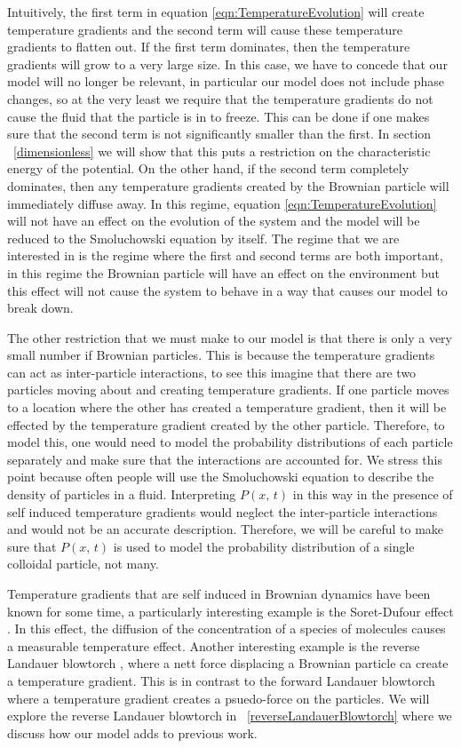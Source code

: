 Intuitively, the first term in equation \ref{eqn:TemperatureEvolution} will create temperature gradients and the second term will cause these temperature gradients to flatten out. If the first term dominates, then the temperature gradients will grow to a very large size. In this case, we have to concede that our model will no longer be relevant, in particular our model does not include phase changes, so at the very least we require that the temperature gradients do not cause the fluid that the particle is in to freeze. This can be done if one makes sure that the second term is not significantly smaller than the first. In section ~\autoref{dimensionless} we will show that this puts a restriction on the characteristic energy of the potential. On the other hand, if the second term completely dominates, then any temperature gradients created by the Brownian particle will immediately diffuse away. In this regime, equation \ref{eqn:TemperatureEvolution} will not have an effect on the evolution of the system and the model will be reduced to the Smoluchowski equation by itself. The regime that we are interested in is the regime where the first and second terms are both important, in this regime the Brownian particle will have an effect on the environment but this effect will not cause the system to behave in a way that causes our model to break down. 

The other restriction that we must make to our model is that there is only a very small number if Brownian particles. This is because the temperature gradients can act as inter-particle interactions, to see this imagine that there are two particles moving about and creating temperature gradients. If one particle moves to a location where the other has created a temperature gradient, then it will be effected by the temperature gradient created by the other particle. Therefore, to model this, one would need to model the probability distributions of each particle separately and make sure that the interactions are accounted for. We stress this point because often people will use the Smoluchowski equation to describe the density of particles in a fluid. Interpreting $P(x, \, t)$ in this way in the presence of self induced temperature gradients would neglect the inter-particle interactions and would not be an accurate description. Therefore, we will be careful to make sure that $P(x, \, t)$ is used to model the probability distribution of a single colloidal particle, not many.  

Temperature gradients that are self induced in Brownian dynamics have been known for some time, a particularly interesting example is the Soret-Dufour effect \cite{Onsager1931,HortLinzLuecke1992,PiazzaGuarino2002,Santamaria-HolekGadomskiRubi2011}. In this effect, the diffusion of the concentration of a species of molecules causes a measurable temperature effect. Another interesting example is the reverse Landauer blowtorch \cite{DasDasBarikEtAl2015}, where a nett force displacing a Brownian particle ca create a temperature gradient. This is in contrast to the forward Landauer blowtorch where a temperature gradient creates a psuedo-force on the particles. We will explore the reverse Landauer blowtorch in ~\autoref{reverseLandauerBlowtorch} where we discuss how our model adds to previous work.

